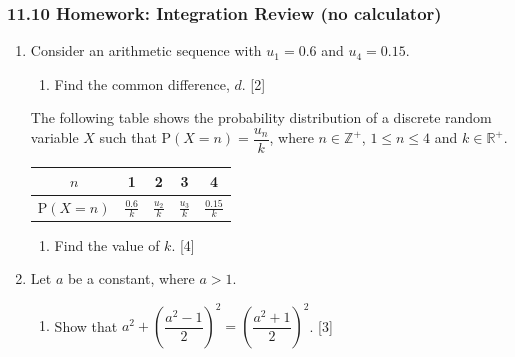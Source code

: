 \documentclass[12pt, twoside]{article}
\begin{document}
\subsubsection*{11.10 Homework: Integration Review (no calculator)}

\begin{enumerate}[itemsep=0.15cm]

\item[1.] Consider an arithmetic sequence with $u_1 = 0.6$ and $u_4 = 0.15$.

\begin{enumerate}[itemsep=0.1cm]
  \item[(a)] Find the common difference, $d$. \hfill [2]
\end{enumerate}
\vspace{0.5cm}
The following table shows the probability distribution of a discrete random variable $X$
such that $\mathrm{P}(X = n) = \dfrac{u_n}{k}$, where $n \in \mathbb{Z}^+$,
$1 \leq n \leq 4$ and $k \in \mathbb{R}^+$.

\renewcommand{\arraystretch}{1.4}
\begin{center}
\begin{tabular}{|c|c|c|c|c|}
    \hline
    $n$ & 1 & 2 & 3 & 4 \\
    \hline
    $\mathrm{P}(X = n)$ & $\frac{0.6}{k}$ & $\frac{u_2}{k}$ & $\frac{u_3}{k}$ & $\frac{0.15}{k}$ \\
    \hline
\end{tabular}
\end{center}
\renewcommand{\arraystretch}{1.0}

\begin{enumerate}[itemsep=0.1cm]
  \item[(b)] Find the value of $k$. \hfill [4]
\end{enumerate}


\newpage

\item[2.] [Maximum mark: 5]

Let $a$ be a constant, where $a > 1$.

\begin{enumerate}[itemsep=0.1cm]
  \item[(a)] Show that $a^2 + \left(\dfrac{a^2 - 1}{2}\right)^2 = \left(\dfrac{a^2 + 1}{2}\right)^2$. \hfill [3]
\end{enumerate}


\end{enumerate}
\end{document}
